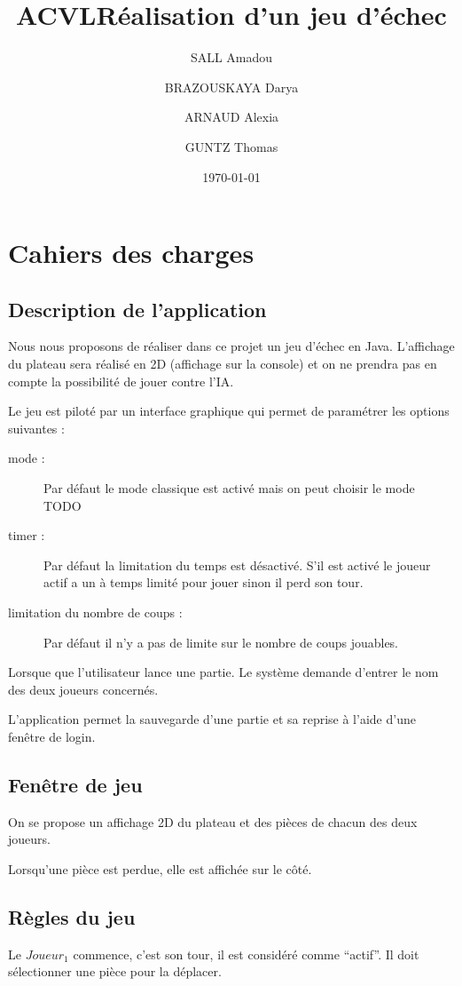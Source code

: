\documentclass[12pt,a4paper]{report}
\title{ACVL}
\title{Réalisation d'un jeu d'échec}
\author{SALL Amadou \and BRAZOUSKAYA Darya \and ARNAUD Alexia \and GUNTZ Thomas }
\date{\today}
\begin{document}
\maketitle
\chapter*{Cahiers des charges}

\section*{Description de l'application}
Nous nous proposons de réaliser dans ce projet un jeu d'échec en Java.
L'affichage du plateau sera réalisé en 2D (affichage sur la console) et on ne prendra pas en compte la possibilité de jouer contre l'IA.

Le jeu est piloté par un interface graphique qui permet de paramétrer les options suivantes :
\begin{description}
\item[mode :] Par défaut le mode classique est activé mais on peut choisir le mode TODO
\item[timer :] Par défaut la limitation du temps est désactivé. S'il est activé le joueur actif a un à temps limité pour jouer sinon il perd son tour.
\item[limitation du nombre de coups :] Par défaut il n'y a pas de limite sur le nombre de coups jouables.
\end{description}

Lorsque que l'utilisateur lance une partie. Le système demande d'entrer le nom des deux joueurs concernés.

L'application permet la sauvegarde d'une partie et sa reprise à l'aide d'une fenêtre de login.

\section*{Fenêtre de jeu}
On se propose un affichage 2D du plateau et des pièces de chacun des deux joueurs.

Lorsqu'une pièce est perdue, elle est affichée sur le côté.

\section*{Règles du jeu}

Le $Joueur_1$ commence, c’est son tour, il est considéré comme ``actif''. Il doit sélectionner une pièce pour la déplacer.
\end{document}
